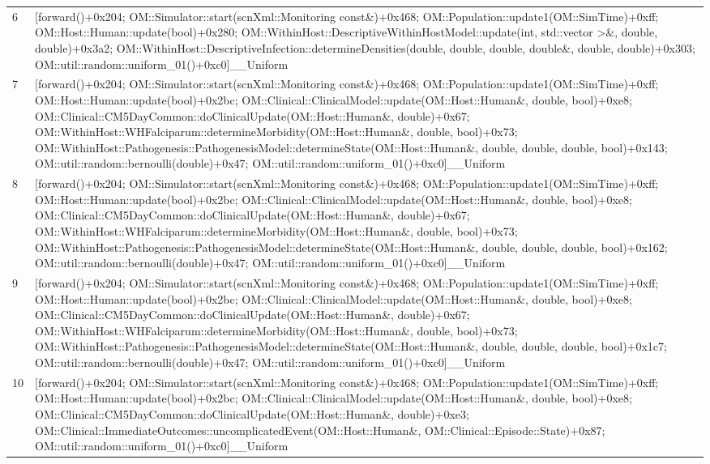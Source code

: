\documentclass{article}
\begin{document}
\begin{table}[b!]
\begin{tabularx}{\textwidth}{@{}lX@{}}
6 & [forward()+0x204; OM::Simulator::start(scnXml::Monitoring const\&)+0x468; OM::Population::update1(OM::SimTime)+0xff; OM::Host::Human::update(bool)+0x280; OM::WithinHost::DescriptiveWithinHostModel::update(int, std::vector \textgreater{}\&, double, double)+0x3a2; OM::WithinHost::DescriptiveInfection::determineDensities(double, double, double, double\&, double, double)+0x303; OM::util::random::uniform\_01()+0xc0]\_\_Uniform\\
7 & [forward()+0x204; OM::Simulator::start(scnXml::Monitoring const\&)+0x468; OM::Population::update1(OM::SimTime)+0xff; OM::Host::Human::update(bool)+0x2bc; OM::Clinical::ClinicalModel::update(OM::Host::Human\&, double, bool)+0xe8; OM::Clinical::CM5DayCommon::doClinicalUpdate(OM::Host::Human\&, double)+0x67; OM::WithinHost::WHFalciparum::determineMorbidity(OM::Host::Human\&, double, bool)+0x73; OM::WithinHost::Pathogenesis::PathogenesisModel::determineState(OM::Host::Human\&, double, double, double, bool)+0x143; OM::util::random::bernoulli(double)+0x47; OM::util::random::uniform\_01()+0xc0]\_\_Uniform\\
8 & [forward()+0x204; OM::Simulator::start(scnXml::Monitoring const\&)+0x468; OM::Population::update1(OM::SimTime)+0xff; OM::Host::Human::update(bool)+0x2bc; OM::Clinical::ClinicalModel::update(OM::Host::Human\&, double, bool)+0xe8; OM::Clinical::CM5DayCommon::doClinicalUpdate(OM::Host::Human\&, double)+0x67; OM::WithinHost::WHFalciparum::determineMorbidity(OM::Host::Human\&, double, bool)+0x73; OM::WithinHost::Pathogenesis::PathogenesisModel::determineState(OM::Host::Human\&, double, double, double, bool)+0x162; OM::util::random::bernoulli(double)+0x47; OM::util::random::uniform\_01()+0xc0]\_\_Uniform\\
9 & [forward()+0x204; OM::Simulator::start(scnXml::Monitoring const\&)+0x468; OM::Population::update1(OM::SimTime)+0xff; OM::Host::Human::update(bool)+0x2bc; OM::Clinical::ClinicalModel::update(OM::Host::Human\&, double, bool)+0xe8; OM::Clinical::CM5DayCommon::doClinicalUpdate(OM::Host::Human\&, double)+0x67; OM::WithinHost::WHFalciparum::determineMorbidity(OM::Host::Human\&, double, bool)+0x73; OM::WithinHost::Pathogenesis::PathogenesisModel::determineState(OM::Host::Human\&, double, double, double, bool)+0x1c7; OM::util::random::bernoulli(double)+0x47; OM::util::random::uniform\_01()+0xc0]\_\_Uniform\\
10 & [forward()+0x204; OM::Simulator::start(scnXml::Monitoring const\&)+0x468; OM::Population::update1(OM::SimTime)+0xff; OM::Host::Human::update(bool)+0x2bc; OM::Clinical::ClinicalModel::update(OM::Host::Human\&, double, bool)+0xe8; OM::Clinical::CM5DayCommon::doClinicalUpdate(OM::Host::Human\&, double)+0xe3; OM::Clinical::ImmediateOutcomes::uncomplicatedEvent(OM::Host::Human\&, OM::Clinical::Episode::State)+0x87; OM::util::random::uniform\_01()+0xc0]\_\_Uniform\\

\end{tabularx}
\end{table}
\end{document}
